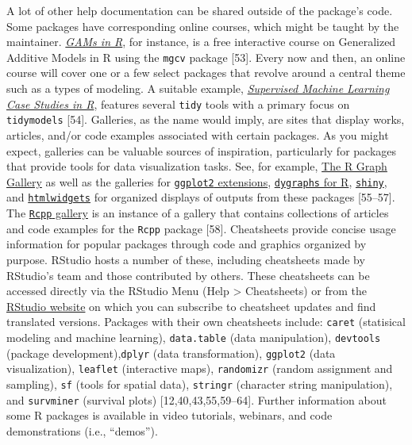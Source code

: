 \documentclass[10pt,letterpaper]{article}
\begin{document}
A lot of other help documentation can be shared outside of the package's
code. Some packages have corresponding online courses, which might be
taught by the maintainer.
\href{https://noamross.github.io/gams-in-r-course/}{\emph{GAMs in R}},
for instance, is a free interactive course on Generalized Additive
Models in R using the \texttt{mgcv} package {[}53{]}. Every now and
then, an online course will cover one or a few select packages that
revolve around a central theme such as a types of modeling. A suitable
example,
\href{https://supervised-ml-course.netlify.app/}{\emph{Supervised
Machine Learning Case Studies in R}}, features several \texttt{tidy}
tools with a primary focus on \texttt{tidymodels} {[}54{]}. Galleries,
as the name would imply, are sites that display works, articles, and/or
code examples associated with certain packages. As you might expect,
galleries can be valuable sources of inspiration, particularly for
packages that provide tools for data visualization tasks. See, for
example, \href{https://www.r-graph-gallery.com/}{The R Graph Gallery} as
well as the galleries for
\href{https://exts.ggplot2.tidyverse.org/gallery/}{\texttt{ggplot2}
extensions},
\href{https://rstudio.github.io/dygraphs/index.html}{\texttt{dygraphs}
for R}, \href{https://shiny.rstudio.com/gallery/}{\texttt{shiny}}, and
\href{https://gallery.htmlwidgets.org/}{\texttt{htmlwidgets}} for
organized displays of outputs from these packages {[}55--57{]}. The
\href{https://gallery.rcpp.org/}{\texttt{Rcpp} gallery} is an instance
of a gallery that contains collections of articles and code examples for
the \texttt{Rcpp} package {[}58{]}. Cheatsheets provide concise usage
information for popular packages through code and graphics organized by
purpose. RStudio hosts a number of these, including cheatsheets made by
RStudio's team and those contributed by others. These cheatsheets can be
accessed directly via the RStudio Menu (Help \textgreater{} Cheatsheets)
or from the \href{https://rstudio.com/resources/cheatsheets/}{RStudio
website} on which you can subscribe to cheatsheet updates and find
translated versions. Packages with their own cheatsheets include:
\texttt{caret} (statisical modeling and machine learning),
\texttt{data.table} (data manipulation), \texttt{devtools} (package
development),\texttt{dplyr} (data transformation), \texttt{ggplot2}
(data visualization), \texttt{leaflet} (interactive maps),
\texttt{randomizr} (random assignment and sampling), \texttt{sf} (tools
for spatial data), \texttt{stringr} (character string manipulation), and
\texttt{survminer} (survival plots) {[}12,40,43,55,59--64{]}. Further
information about some R packages is available in video tutorials,
webinars, and code demonstrations (i.e., ``demos'').
\end{document}
